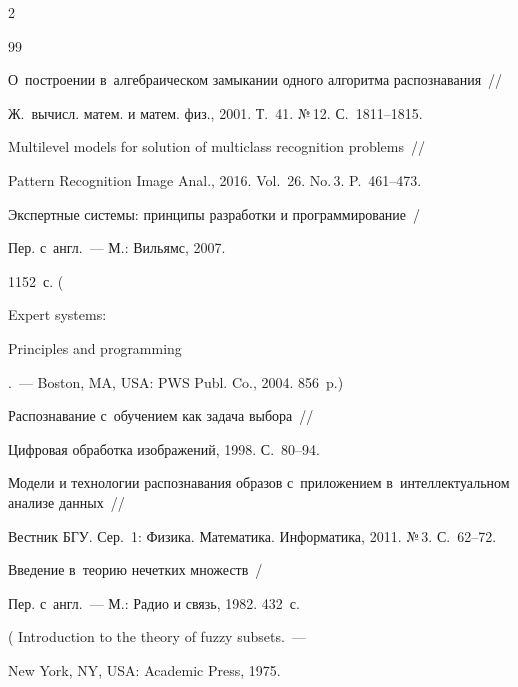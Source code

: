 \begin{multicols}{2}
{{\begin{thebibliography}{99}




{О~построении в~алгебраическом замыкании одного алгоритма распознавания}~//


    Ж.~вычисл. матем. и матем. физ., 2001. Т.~41. №\,12. С.~1811--1815.






{Multilevel models for solution of multiclass recognition problems}~//


    Pattern Recognition Image Anal., 2016. Vol.~26. No.\,3. P.~461--473.









Экспертные системы: принципы разработки и программирование~/


Пер. с~англ.~--- М.: Вильямс, 2007. 


1152~с. ( {Expert systems: 


Principles and programming}.~---  Boston, MA, USA: PWS Publ. Co., 2004. 856~p.)






{Распознавание с~обучением как задача выбора}~//


    Цифровая обработка изображений, 1998. С.~80--94.






{Модели и технологии распознавания образов с~приложением в~интеллектуальном анализе данных}~//


    Вестник БГУ. Сер.~1: Физика. Математика. Информатика, 2011. №\,3. С.~62--72.






Введение в~теорию нечетких множеств~/


Пер. с~англ.~--- М.: Радио и связь, 1982. 432~с.


( {Introduction to the theory of fuzzy subsets.}~---


New York, NY, USA: Academic Press, 1975.



\end{thebibliography}}}
\end{multicols}
